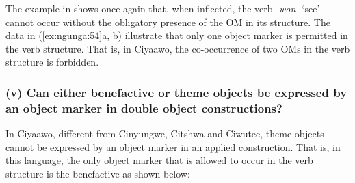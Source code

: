 \documentclass[output=paper]{langscibook}
\begin{document}
\ea\label{ex:ngunga:54}


\z
\z

The example in  shows once again that, when inflected, the verb -\textit{won}{}- ‘see’ cannot occur without the obligatory presence of the OM in its structure. The data in (\ref{ex:ngunga:54}a, b) illustrate that only one object marker is permitted in the verb structure. That is, in Ciyaawo, the co-occurrence of two OMs in the verb structure is forbidden. 

\subsubsection{(v) Can either benefactive or theme objects be expressed by an object marker in double object constructions?}

In Ciyaawo, different from Cinyungwe, Citshwa and Ciwutee, theme objects cannot be expressed by an object marker in an applied construction. That is, in this language, the only object marker that is allowed to occur in the verb structure is the benefactive as shown below:

\ea\label{ex:ngunga:55}
\end{document}
